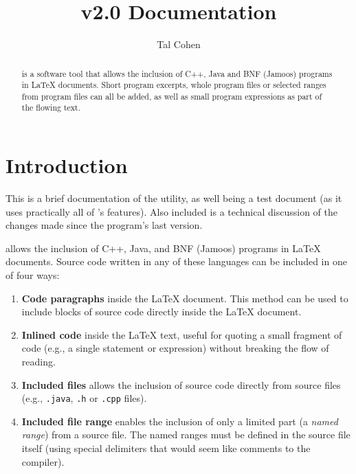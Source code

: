 \documentclass[twoside,12pt]{article}
\title{\progtex{} v2.0 Documentation}
\author{Tal Cohen}
\begin{document}
\maketitle

\begin{abstract}
\progtex{} is a software tool that allows the inclusion of C++, Java and BNF (Jamoos)
    programs in \LaTeX{} documents.
Short program excerpts, whole program files or selected ranges from program files can
    all be added, as well as small program expressions as part of the flowing text.
\end{abstract}

\section{Introduction}

This is a brief documentation of the \progtex{} utility, as well
    being a test document (as it uses practically all of
    \progtex{}'s features).
Also included is a technical discussion of the changes made
    since the program's last version.

\progtex{} allows the inclusion of C++, Java, and BNF (Jamoos) programs in
    \LaTeX{} documents.
Source code written in any of these languages can be
    included in one of four ways:

\begin{enumerate}

\item{\textbf{Code paragraphs}} inside the \LaTeX{} document. This method can
    be used to include blocks of source code directly inside the
    \LaTeX{} document.

\item{\textbf{Inlined code}} inside the \LaTeX{} text, useful for quoting a small
    fragment of code (e.g., a single statement or expression) without breaking
    the flow of reading.

\item{\textbf{Included files}} allows the inclusion of source code directly from
    source files (e.g., \texttt{.java}, \texttt{.h} or \texttt{.cpp}
    files).

\item{\textbf{Included file range}} enables the inclusion of only a limited part (a
    \emph{named range}) from a source file.
The named ranges must be defined in the source file itself (using special
    delimiters that would seem like comments to the compiler).

\end{enumerate}
\end{document}
